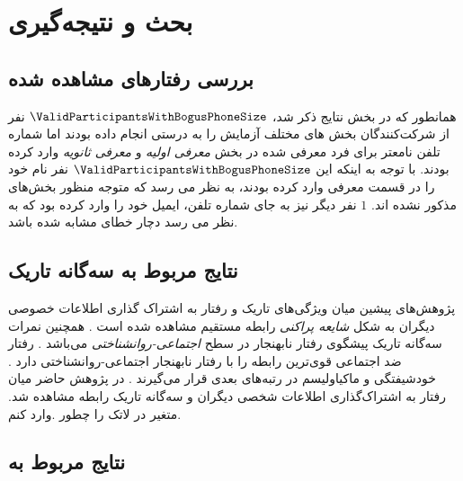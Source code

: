 \chapter{بحث و نتیجه‌گیری}
\section{بررسی رفتارهای مشاهده شده }
همانطور که در بخش نتایج ذکر شد،
$\ValidParticipantsWithBogusPhoneSize$
 نفر  از شرکت‌کنندگان 
بخش های مختلف آزمایش را به درستی انجام داده بودند اما شماره تلفن نامعتر
برای فرد معرفی شده در بخش‌ 
\textit{معرفی اولیه}
و
\textit{معرفی ثانویه}
وارد کرده بودند. با توجه به اینکه این $\ValidParticipantsWithBogusPhoneSize$
نفر نام
خود را در قسمت معرفی وارد کرده بودند، به نظر می رسد که متوجه منظور بخش‌های مذکور نشده اند.
$1$
نفر دیگر نیز به جای شماره تلفن، ایمیل خود را وارد کرده بود که به نظر می رسد دچار خطای مشابه 
شده باشد. 
\section{نتایج مربوط به سه‌گانه تاریک}
پژوهش‌های پیشین میان ویژگی‌های تاریک و رفتار
به اشتراک گذاری اطلاعات خصوصی دیگران به شکل
\textit{
    شایعه پراکنی
}
رابطه مستقیم مشاهده شده است
\!\cite{hartungBetterItsReputation2019}
\!.
همچنین نمرات سه‌گانه تاریک پیشگوی رفتار نابهنجار در سطح
\textit{
    اجتماعی-روانشناختی
}
می‌باشد
\!\cite{murisMalevolentSideHuman2017}
\!.
رفتار ضد اجتماعی قوی‌ترین رابطه را با رفتار نابهنجار اجتماعی-روانشناختی دارد
\!. خودشیفتگی
و ماکیاولیسم
در رتبه‌های بعدی قرار می‌گیرند
\!.
در پژوهش حاضر میان رفتار به اشتراک‌گذاری اطلاعات شخصی دیگران و سه‌گانه تاریک رابطه مشاهده شد.
متغیر در لاتک را چطور .وارد کنم.
\section{
    نتایج مربوط به
}
